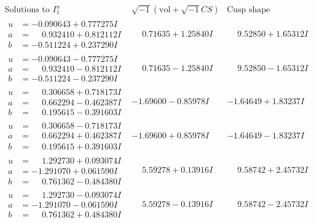 \documentclass[1p]{elsarticle_modified}
\theoremstyle{definition}
\newcommand{\I}{\sqrt{-1}}
\begin{document}
$$\begin{array}{c|c|c}  
\text{Solutions to }I^u_{1}& \I (\text{vol} + \sqrt{-1}CS) & \text{Cusp shape}\\
 \hline 
\begin{aligned}
u &= -0.090643 + 0.777275 I \\
a &= \phantom{-}0.932410 + 0.812112 I \\
b &= -0.511224 + 0.237290 I\end{aligned}
 & \phantom{-}0.71635 + 1.25840 I & \phantom{-}9.52850 + 1.65312 I \\ \hline\begin{aligned}
u &= -0.090643 - 0.777275 I \\
a &= \phantom{-}0.932410 - 0.812112 I \\
b &= -0.511224 - 0.237290 I\end{aligned}
 & \phantom{-}0.71635 - 1.25840 I & \phantom{-}9.52850 - 1.65312 I \\ \hline\begin{aligned}
u &= \phantom{-}0.306658 + 0.718173 I \\
a &= \phantom{-}0.662294 - 0.462387 I \\
b &= \phantom{-}0.195615 - 0.391603 I\end{aligned}
 & -1.69600 - 0.85978 I & -1.64649 + 1.83237 I \\ \hline\begin{aligned}
u &= \phantom{-}0.306658 - 0.718173 I \\
a &= \phantom{-}0.662294 + 0.462387 I \\
b &= \phantom{-}0.195615 + 0.391603 I\end{aligned}
 & -1.69600 + 0.85978 I & -1.64649 - 1.83237 I \\ \hline\begin{aligned}
u &= \phantom{-}1.292730 + 0.093074 I \\
a &= -1.291070 + 0.061590 I \\
b &= \phantom{-}0.761362 - 0.484380 I\end{aligned}
 & \phantom{-}5.59278 + 0.13916 I & \phantom{-}9.58742 + 2.45732 I \\ \hline\begin{aligned}
u &= \phantom{-}1.292730 - 0.093074 I \\
a &= -1.291070 - 0.061590 I \\
b &= \phantom{-}0.761362 + 0.484380 I\end{aligned}
 & \phantom{-}5.59278 - 0.13916 I & \phantom{-}9.58742 - 2.45732 I \\ \hline\begin{aligned}

\end{aligned}
\end{array}$$
\end{document}
